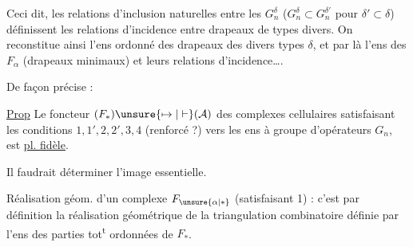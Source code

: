 
Ceci dit, les relations d'inclusion naturelles entre les $G_n^\delta$ ($G_n^\delta\subset G_n^{\delta'}$ pour $\delta'\subset\delta$) définissent les relations d'incidence  entre drapeaux de types \deleted{\unsure{$\delta$}} divers. On reconstitue ainsi l'ens ordonné des drapeaux des divers types $\delta$, et par là l'ens des $F_\alpha$ (drapeaux minimaux) et leurs relations d'incidence\ldots.

De façon précise :

\uline{Prop} Le foncteur $(F_*)\unsure{\mapsto|\vdash}(\mathcal A)$ des complexes cellulaires satisfaisant les conditions $1,1',2,2',3,4$ (renforcé ?) vers les ens à groupe d'opérateurs $G_n$, est \uline{pl. fidèle}.

Il faudrait déterminer l'image essentielle.


Réalisation géom. d'un complexe $F_{\unsure{\alpha|*}}$ (satisfaisant  1) : c'est par définition la réalisation géométrique de la triangulation combinatoire définie par l'ens des parties  tot\textsuperscript{t} ordonnées de $F_*$.

